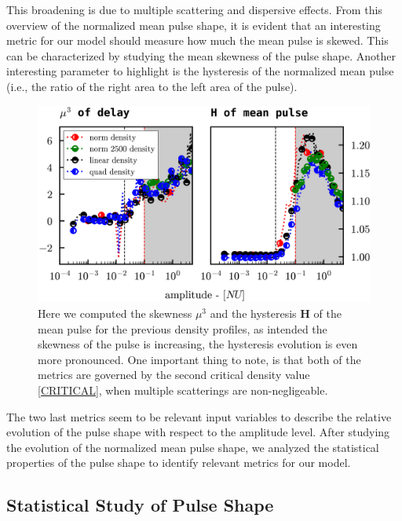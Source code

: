 \documentclass[11pt,a4paper,openany]{report}
\begin{document}
\begin{multicols}{2}
    This broadening is due to multiple scattering and dispersive effects. From this overview of the normalized mean pulse shape, it is evident that an interesting metric for our model should measure how much the mean pulse is skewed. This can be characterized by studying the mean skewness of the pulse shape. Another interesting parameter to highlight is the hysteresis of the normalized mean pulse (i.e., the ratio of the right area to the left area of the pulse).
    \begin{figure}[H]
        \centering
        \includegraphics[width=1\linewidth]{./figures/skew_Hyst.png}
        \caption{Here we computed the skewness $\mu^3$ and the hysteresis \textbf{H} of the mean pulse for the previous density profiles, as intended the skewness of the pulse is increasing, the hysteresis evolution is even more pronounced. One important thing to note, is that both of the metrics are governed by the second critical density value \ref{CRITICAL}, when multiple scatterings are non-negligeable.}
        \label{}
    \end{figure}
    The two last metrics seem to be relevant input variables to describe the relative evolution of the pulse shape with respect to the amplitude level. After studying the evolution of the normalized mean pulse shape, we analyzed the statistical properties of the pulse shape to identify relevant metrics for our model.
    \subsection{Statistical Study of Pulse Shape}





\end{multicols}
\end{document}
